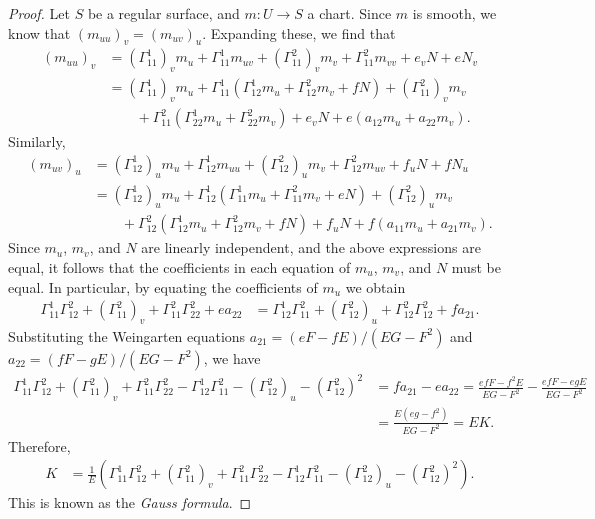 \begin{proof}
    Let $S$ be a regular surface, and $m: U \to S$ a chart. Since $m$ is smooth, we know that $(m_{uu})_v = (m_{uv})_u$. Expanding these, we find that
    \begin{align*}
        (m_{uu})_v &= \left(\Gamma_{11}^{1}\right)_vm_u + \Gamma_{11}^{1}m_{uv} + (\Gamma_{11}^{2})_vm_v + \Gamma_{11}^{2}m_{vv} + e_vN + eN_v \\
        &= \left(\Gamma_{11}^{1}\right)_vm_u + \Gamma_{11}^{1}\left(\Gamma_{12}^{1}m_u + \Gamma_{12}^{2}m_v + fN\right) + (\Gamma_{11}^{2})_vm_v \\
        &\quad\quad+ \Gamma_{11}^{2}\left(\Gamma_{22}^{1}m_u + \Gamma_{22}^{2}m_v\right) + e_vN + e\left(a_{12}m_u + a_{22}m_v\right).
    \end{align*}
    Similarly,
    \begin{align*}
        \left(m_{uv}\right)_u &= \left(\Gamma_{12}^{1}\right)_um_u + \Gamma_{12}^{1}m_{uu} + \left(\Gamma_{12}^{2}\right)_um_v + \Gamma_{12}^{2}m_{uv} + f_uN + fN_u \\
        &= \left(\Gamma_{12}^{1}\right)_um_u + \Gamma_{12}^{1}\left(\Gamma_{11}^{1}m_u + \Gamma_{11}^{2}m_v + eN\right) + \left(\Gamma_{12}^{2}\right)_um_v \\
        &\quad\quad+ \Gamma_{12}^{2}\left(\Gamma_{12}^1m_u + \Gamma_{12}^{2}m_v + fN\right) + f_uN + f\left(a_{11}m_u + a_{21}m_v\right).
    \end{align*}
    Since $m_u$, $m_v$, and $N$ are linearly independent, and the above expressions are equal, it follows that the coefficients in each equation of $m_u$, $m_v$, and $N$ must be equal. In particular, by equating the coefficients of $m_u$ we obtain
    \begin{align*}
        \Gamma_{11}^{1}\Gamma_{12}^{2} + \left(\Gamma_{11}^{2}\right)_v + \Gamma_{11}^{2}\Gamma_{22}^{2} + ea_{22} &= \Gamma_{12}^{1}\Gamma_{11}^{2} + \left(\Gamma_{12}^{2}\right)_u + \Gamma_{12}^{2}\Gamma_{12}^{2} + fa_{21}.
    \end{align*}
    Substituting the Weingarten equations $a_{21} = (eF - fE)/(EG - F^2)$ and $a_{22} = (fF - gE)/(EG - F^2)$, we have
    \begin{align*}
        \Gamma_{11}^{1}\Gamma_{12}^{2} + \left(\Gamma_{11}^{2}\right)_v + \Gamma_{11}^{2}\Gamma_{22}^{2} - \Gamma_{12}^{1}\Gamma_{11}^{2} - (\Gamma_{12}^2)_u - \left(\Gamma_{12}^{2}\right)^2 &= fa_{21} - ea_{22} = \frac{efF - f^2E}{EG-F^2} - \frac{efF - egE}{EG - F^2} \\
        &= \frac{E(eg - f^2)}{EG - F^2} = EK.
    \end{align*}
    Therefore,
    \begin{align*}\tag{$\star$}
        K &= \frac{1}{E}\left(\Gamma_{11}^{1}\Gamma_{12}^{2} + \left(\Gamma_{11}^{2}\right)_v + \Gamma_{11}^{2}\Gamma_{22}^{2} - \Gamma_{12}^{1}\Gamma_{11}^{2} - (\Gamma_{12}^2)_u - \left(\Gamma_{12}^{2}\right)^2\right).
    \end{align*}
    This is known as the \emph{Gauss formula}.
\end{proof}

